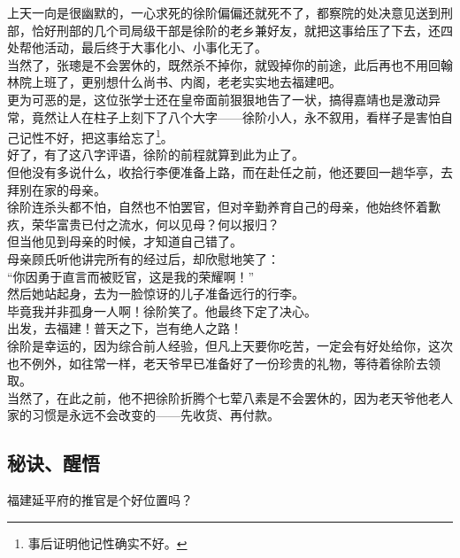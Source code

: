 \begin{multicols}{\theparacolNo}
上天一向是很幽默的，一心求死的徐阶偏偏还就死不了，都察院的处决意见送到刑部，恰好刑部的几个司局级干部是徐阶的老乡兼好友，就把这事给压了下去，还四处帮他活动，最后终于大事化小、小事化无了。\\

当然了，张璁是不会罢休的，既然杀不掉你，就毁掉你的前途，此后再也不用回翰林院上班了，更别想什么尚书、内阁，老老实实地去福建吧。\\

更为可恶的是，这位张学士还在皇帝面前狠狠地告了一状，搞得嘉靖也是激动异常，竟然让人在柱子上刻下了八个大字——徐阶小人，永不叙用，看样子是害怕自己记性不好，把这事给忘了\footnote{事后证明他记性确实不好。}。\\

好了，有了这八字评语，徐阶的前程就算到此为止了。\\

但他没有多说什么，收拾行李便准备上路，而在赴任之前，他还要回一趟华亭，去拜别在家的母亲。\\

徐阶连杀头都不怕，自然也不怕罢官，但对辛勤养育自己的母亲，他始终怀着歉疚，荣华富贵已付之流水，何以见母？何以报归？\\

但当他见到母亲的时候，才知道自己错了。\\

母亲顾氏听他讲完所有的经过后，却欣慰地笑了：\\

“你因勇于直言而被贬官，这是我的荣耀啊！”\\

然后她站起身，去为一脸惊讶的儿子准备远行的行李。\\

毕竟我并非孤身一人啊！徐阶笑了。他最终下定了决心。\\

出发，去福建！普天之下，岂有绝人之路！\\

徐阶是幸运的，因为综合前人经验，但凡上天要你吃苦，一定会有好处给你，这次也不例外，如往常一样，老天爷早已准备好了一份珍贵的礼物，等待着徐阶去领取。\\

当然了，在此之前，他不把徐阶折腾个七荤八素是不会罢休的，因为老天爷他老人家的习惯是永远不会改变的——先收货、再付款。\\

\subsection{秘诀、醒悟}
福建延平府的推官是个好位置吗？\\


\end{multicols}
